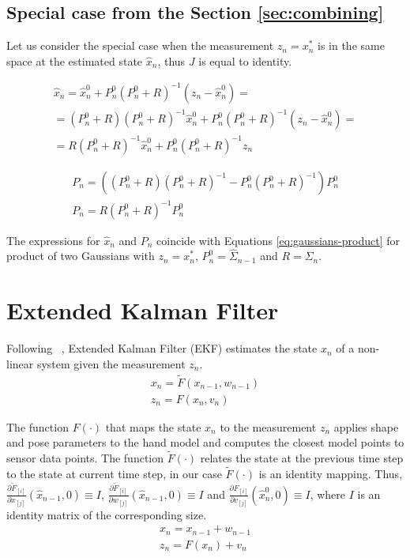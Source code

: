 \subsection{Special case from the Section  \ref{sec:combining}}
Let us consider the special case when the measurement $z_n = x_n^*$ is in the same space at the estimated state $\hat{x}_n$, thus $J$ is equal to identity.

\begin{align*}
\hat{x}_n = \hat{x}_n^0 + P_n^0  (P_n^0 + R)^{-1}(z_n - \hat{x}_n^0) = \\
= (P_n^0 + R)(P_n^0 + R)^{-1}\hat{x}_n^0 + P_n^0  (P_n^0 + R)^{-1}(z_n - \hat{x}_n^0) = \\
= R(P_n^0 + R)^{-1}\hat{x}_n^0 + P_n^0  (P_n^0 + R)^{-1}z_n 
 \end{align*}

\begin{align*}
P_n = ((P_n^0 + R) (P_n^0 + R)^{-1} - P_n^0  (P_n^0 + R)^{-1}) P_n^0\\
P_n = R (P_n^0 + R)^{-1} P_n^0
\end{align*}

The expressions for $\hat{x}_n$ and $P_n$ coincide with Equations \ref{eq:gaussians-product} for product of two Gaussians  with $z_n = x_n^*$, $P_n^0 = \hat{\Sigma}_{n - 1}$ and $R = \Sigma_{n}$.

\section{Extended Kalman Filter}

Following ~\cite{welch1995introduction}, Extended Kalman Filter (EKF) estimates the state $x_n$  of a non-linear system given the measurement $z_n$.
\begin{align}
x_n = \tilde{F}(x_{n - 1},  w_{n - 1}) \\
z_n = F(x_n, v_n)
\end{align}

The function $F(\cdot)$ that maps the state $x_n$ to the measurement $z_n$ applies shape and pose parameters to the hand model and computes the closest model points to sensor data points. 
The function $\tilde{F}(\cdot)$ relates the state at the previous time step to the state at current time step, in our case $\tilde{F}(\cdot)$ is an identity mapping. Thus, $\frac{ \partial \tilde{F}_{[i]}}{ \partial x_{[j]}}(\hat{x}_{n - 1}, 0) \equiv I$, 
$\frac{ \partial \tilde{F}_{[i]}}{ \partial w_{[j]}}(\hat{x}_{n - 1}, 0) \equiv I$ and $\frac{ \partial F_{[i]}}{ \partial v_{[j]}}(\hat{x}_n^0, 0) \equiv I$, where $I$ is an identity matrix of the corresponding size.
\begin{align}
x_n = x_{n - 1} + w_{n - 1} \\
z_n = F(x_n) + v_n 
\end{align}



